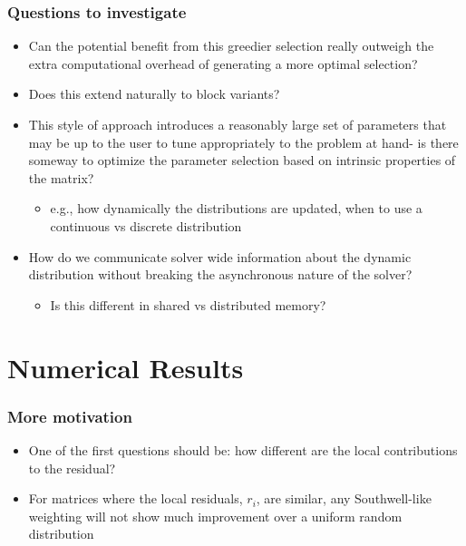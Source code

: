 \documentclass{beamer}
\begin{document}
\begin{frame}
	\frametitle{Questions to investigate}
	\begin{itemize}
		\item Can the potential benefit from this greedier selection really outweigh the extra computational overhead of generating a more optimal selection?
		\item Does this extend naturally to block variants?
		\item This style of approach introduces a reasonably large set of parameters that may be up to the user to tune appropriately to the problem at hand- is there someway to optimize the parameter selection based on intrinsic properties of the matrix?
		    \begin{itemize}
		        \item e.g., how dynamically the distributions are updated, when to use a continuous vs discrete distribution
		    \end{itemize}
	    \item How do we communicate solver wide information about the dynamic distribution without breaking the asynchronous nature of the solver?
	        \begin{itemize}
	            \item Is this different in shared vs distributed memory?
	        \end{itemize}
	\end{itemize}
\end{frame}

\section{Numerical Results}

\begin{frame}
	\frametitle{More motivation}
	\begin{itemize}
		\item One of the first questions should be: how different are the local contributions to the residual?
		\item For matrices where the local residuals, $r_i$, are similar, any Southwell-like weighting will not show much improvement over a uniform random distribution
	\end{itemize}
\end{frame}
\end{document}
